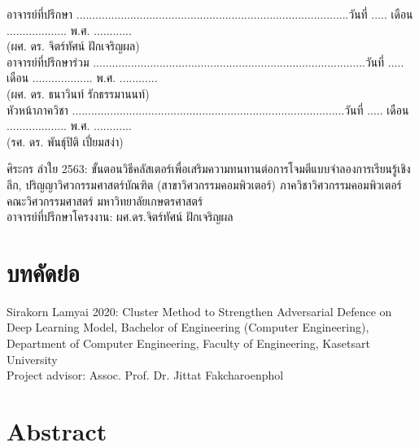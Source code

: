     \noindent
    อาจารย์ที่ปรึกษา \hfill
    ......................................................................................วันที่ ..... เดือน ................... พ.ศ. ............\\
    \hspace*{2cm}(ผศ. ดร. จิตร์ทัศน์ ฝักเจริญผล)\\
    อาจารย์ที่ปรึกษาร่วม \hfill
    ......................................................................................วันที่ ..... เดือน ................... พ.ศ. ............\\
    \hspace*{2cm}(ผศ. ดร. ธนาวินท์ รักธรรมานนท์)\\
    หัวหน้าภาควิชา \hfill
    ......................................................................................วันที่ ..... เดือน ................... พ.ศ. ............\\
    \hspace*{2cm}(รศ. ดร. พันธุ์ปิติ เปี่ยมสง่า)
\newpage
{}

\noindent
ศิระกร ลำใย 2563: ขั้นตอนวิธีคลัสเตอร์เพื่อเสริมความทนทานต่อการโจมตีแบบจําลองการเรียนรู้เชิงลึก,
ปริญญาวิศวกรรมศาสตร์บัณฑิต (สาขาวิศวกรรมคอมพิวเตอร์) ภาควิชาวิศวกรรมคอมพิวเตอร์ คณะวิศวกรรมศาสตร์ มหาวิทยาลัยเกษตรศาสตร์\\
อาจารย์ที่ปรึกษาโครงงาน: ผศ.ดร.จิตร์ทัศน์ ฝักเจริญผล

\begingroup
\let\clearpage\relax
\chapter*{บทคัดย่อ}
\endgroup

\newpage

\noindent
Sirakorn Lamyai 2020: Cluster Method to Strengthen Adversarial Defence on Deep Learning Model,
Bachelor of Engineering (Computer Engineering), Department of Computer Engineering, Faculty of Engineering, Kasetsart University\\
Project advisor: Assoc. Prof. Dr. Jittat Fakcharoenphol

\begingroup
\let\clearpage\relax
\chapter*{Abstract}
\endgroup
